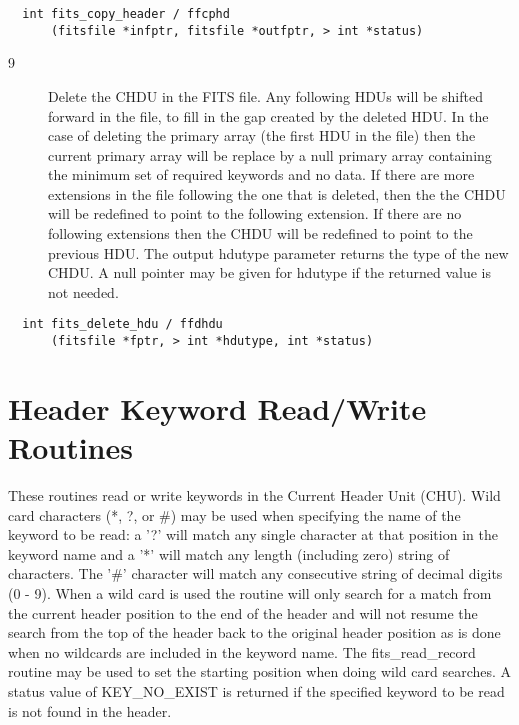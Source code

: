 \documentclass[11pt]{book}
\begin{document}
\begin{verbatim}
  int fits_copy_header / ffcphd
      (fitsfile *infptr, fitsfile *outfptr, > int *status)
\end{verbatim}

\begin{description}
\item[9 ]  Delete the CHDU in the FITS file.  Any following HDUs will be shifted
    forward in the file, to fill in the gap created by the deleted
    HDU.  In the case of deleting the primary array (the first HDU in
    the file) then the current primary array will be replace by a null
    primary array containing the minimum set of required keywords and
    no data.  If there are more extensions in the file following the
    one that is deleted, then the the CHDU will be redefined to point
    to the following extension.  If there are no following extensions
    then the CHDU will be redefined to point to the previous HDU.  The
    output hdutype parameter returns the type of the new CHDU.  A null
    pointer may be given for
   hdutype if the returned value is not needed. \label{ffdhdu}
\end{description}

\begin{verbatim}
  int fits_delete_hdu / ffdhdu
      (fitsfile *fptr, > int *hdutype, int *status)
\end{verbatim}

\section{Header Keyword Read/Write Routines}

These routines read or write keywords in the Current Header Unit
(CHU).  Wild card characters (*, ?, or \#) may be used when specifying
the name of the keyword to be read: a '?' will match any single
character at that position in the keyword name and a '*' will match any
length (including zero) string of characters.  The '\#' character will
match any consecutive string of decimal digits (0 - 9).  When a wild
card is used the routine will only search for a match from the current
header position to the end of the header and will not resume the search
from the top of the header back to the original header position as is
done when no wildcards are included in the keyword name.  The
fits\_read\_record routine may be used to set the starting position
when doing wild card searches.  A status value of KEY\_NO\_EXIST is
returned if the specified keyword to be read is not found in the
header.
\end{document}
